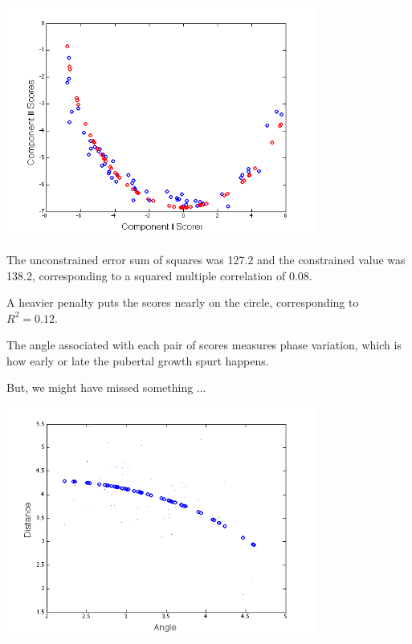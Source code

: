 \documentclass[11pt]{beamer}
\begin{document}
\begin{frame}

\begin{center}
\includegraphics[width=4in]{figs/GrowthScore_1.png}
\end{center}

\end{frame}


\begin{frame}

\bi
  \item The unconstrained error sum of squares was 127.2 and the constrained value was 138.2,
  corresponding to a squared multiple correlation of 0.08.  
  \item A heavier penalty puts the scores nearly on the circle, corresponding to $R^2 = 0.12.$
  \item The angle associated with each pair of scores measures phase variation, which is how early or late the pubertal growth spurt happens.
  \item But, we might have missed something ...
\ei

\end{frame}


\begin{frame}

\begin{center}
\includegraphics[width=4in]{figs/GrowthFSmooth.png}
\end{center}

\end{frame}
\end{document}
